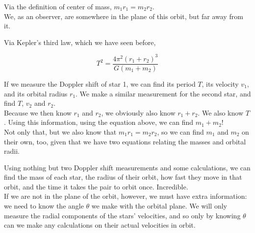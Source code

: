 \begin{figure}[H]
  \centering
\end{figure}
 
Via the definition of center of mass, $m_1 r_1 = m_2 r_2$.\\
We, as an observer, are somewhere in the plane of this orbit, but far away from it.

Via Kepler's third law, which we have seen before,

\begin{equation}
T^2 = \frac{4 \pi^2 (r_1 + r_2)^3}{G (m_1 + m_2)}
\end{equation}

If we measure the Doppler shift of star 1, we can find its period $T$, its velocity $v_1$, and its orbital radius $r_1$. We make a similar measurement for the second star, and find $T$, $v_2$ and $r_2$.\\
Because we then know $r_1$ and $r_2$, we obviously also know $r_1 + r_2$. We also know $T$. Using this information, using the equation above, we can find $m_1 + m_2$!\\
Not only that, but we also know that $m_1 r_1 = m_2 r_2$, so we can find $m_1$ and $m_2$ on their own, too, given that we have two equations relating the masses and orbital radii.

Using nothing but two Doppler shift measurements and some calculations, we can find the mass of each star, the radius of their orbit, how fast they move in that orbit, and the time it takes the pair to orbit once. Incredible.\\
If we are not in the plane of the orbit, however, we must have extra information: we need to know the angle $\theta$ we make with the orbital plane. We will only measure the radial components of the stars' velocities, and so only by knowing $\theta$ can we make any calculations on their actual velocities in orbit.


